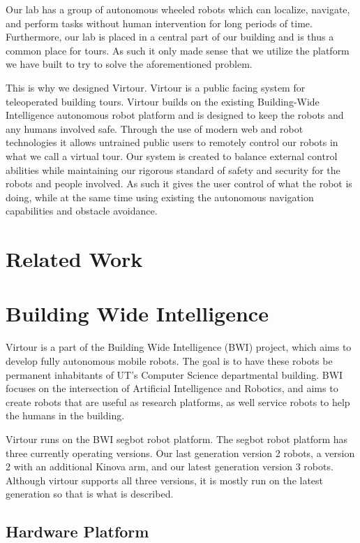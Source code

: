 \documentclass{sig-alternate-05-2015}
\begin{document}
Our lab has a group of autonomous wheeled robots which can localize, navigate,
and perform tasks without human intervention for long periods of time.
Furthermore, our lab is placed in a central part of our building and is thus a
common place for tours. As such it only made sense that we utilize the platform
we have built to try to solve the aforementioned problem.

This is why we designed Virtour. Virtour is a public facing system for
teleoperated building tours. Virtour builds on the existing Building-Wide
Intelligence autonomous robot platform and is designed to keep the robots and
any humans involved safe. Through the use of modern web and robot technologies
it allows untrained public users to remotely control our robots in what we call
a virtual tour. Our system is created to balance external control abilities
while maintaining our rigorous standard of safety and security for the robots
and people involved. As such it gives the user control of what the robot is
doing, while at the same time using existing the autonomous navigation
capabilities and obstacle avoidance.

\section{Related Work}

\section{Building Wide Intelligence}

Virtour is a part of the Building Wide Intelligence (BWI) project,
which aims to develop fully autonomous mobile robots. The goal is to have these
robots be permanent inhabitants of UT's Computer Science departmental
building. BWI focuses on the intersection of Artificial Intelligence and
Robotics, and aims to create robots that are useful as research platforms, as
well service robots to help the humans in the building.

Virtour runs on the BWI segbot robot platform. The segbot robot platform
has three currently operating versions. Our last generation version 2 robots, a
version 2 with an additional Kinova arm, and our latest generation version 3
robots. Although virtour supports all three versions, it is mostly run on the
latest generation so that is what is described.

\subsection{Hardware Platform}
\end{document}
